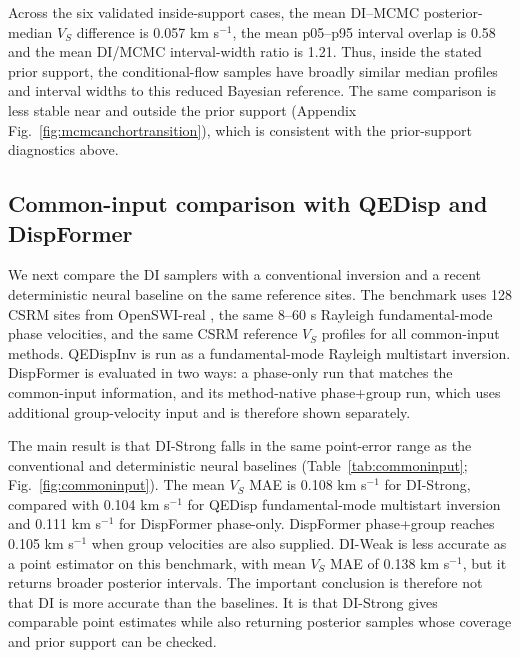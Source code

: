 \documentclass[referee]{gji}
\begin{document}
Across the six validated inside-support cases, the mean DI--MCMC posterior-median $V_S$ difference is 0.057 km s$^{-1}$, the mean p05--p95 interval overlap is 0.58 and the mean DI/MCMC interval-width ratio is 1.21. Thus, inside the stated prior support, the conditional-flow samples have broadly similar median profiles and interval widths to this reduced Bayesian reference. The same comparison is less stable near and outside the prior support (Appendix Fig.~\ref{fig:mcmcanchortransition}), which is consistent with the prior-support diagnostics above.

\subsection{Common-input comparison with QEDisp and DispFormer}

We next compare the DI samplers with a conventional inversion and a recent deterministic neural baseline on the same reference sites. The benchmark uses 128 CSRM sites from OpenSWI-real \citep{LiuEtAl2026OpenSWI}, the same 8--60 s Rayleigh fundamental-mode phase velocities, and the same CSRM reference $V_S$ profiles for all common-input methods. QEDispInv \citep{PanEtAl2026QEDispInv} is run as a fundamental-mode Rayleigh multistart inversion. DispFormer \citep{LiuEtAl2025DispFormer} is evaluated in two ways: a phase-only run that matches the common-input information, and its method-native phase+group run, which uses additional group-velocity input and is therefore shown separately.

The main result is that DI-Strong falls in the same point-error range as the conventional and deterministic neural baselines (Table~\ref{tab:commoninput}; Fig.~\ref{fig:commoninput}). The mean $V_S$ MAE is 0.108 km s$^{-1}$ for DI-Strong, compared with 0.104 km s$^{-1}$ for QEDisp fundamental-mode multistart inversion and 0.111 km s$^{-1}$ for DispFormer phase-only. DispFormer phase+group reaches 0.105 km s$^{-1}$ when group velocities are also supplied. DI-Weak is less accurate as a point estimator on this benchmark, with mean $V_S$ MAE of 0.138 km s$^{-1}$, but it returns broader posterior intervals. The important conclusion is therefore not that DI is more accurate than the baselines. It is that DI-Strong gives comparable point estimates while also returning posterior samples whose coverage and prior support can be checked.
\end{document}

